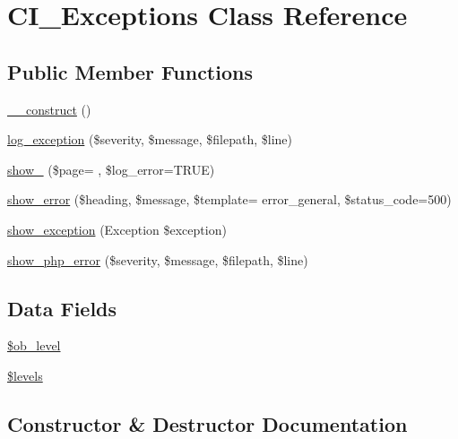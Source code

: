 \hypertarget{class_c_i___exceptions}{}\section{C\+I\+\_\+\+Exceptions Class Reference}
\label{class_c_i___exceptions}
\subsection*{Public Member Functions}
\begin{DoxyCompactItemize}
\item 
\hyperlink{class_c_i___exceptions_a095c5d389db211932136b53f25f39685}{\+\_\+\+\_\+construct} ()
\item 
\hyperlink{class_c_i___exceptions_a477bd3360509887aeb6e0a56bcdcad2a}{log\+\_\+exception} (\$severity, \$message, \$filepath, \$line)
\item 
\hyperlink{class_c_i___exceptions_a7ec82c1b0d3bbeb9338f236a1755a2a5}{show\+\_} (\$page= \textquotesingle{}\textquotesingle{}, \$log\+\_\+error=T\+R\+U\+E)
\item 
\hyperlink{class_c_i___exceptions_af68ad4102f7a42f9aaf68c40afe6d02c}{show\+\_\+error} (\$heading, \$message, \$template= \textquotesingle{}error\+\_\+general\textquotesingle{}, \$status\+\_\+code=500)
\item 
\hyperlink{class_c_i___exceptions_ac781a8be253cad387841809c44c85639}{show\+\_\+exception} (Exception \$exception)
\item 
\hyperlink{class_c_i___exceptions_a7962c30cacf1341dac1c44d8ab57cebe}{show\+\_\+php\+\_\+error} (\$severity, \$message, \$filepath, \$line)
\end{DoxyCompactItemize}
\subsection*{Data Fields}
\begin{DoxyCompactItemize}
\item 
\hyperlink{class_c_i___exceptions_abb6b6587dbaf0238bf26829c8df05d59}{\$ob\+\_\+level}
\item 
\hyperlink{class_c_i___exceptions_a1035dc0448354cc79f8f9e1ca8dfd0cb}{\$levels}
\end{DoxyCompactItemize}


\subsection{Constructor \& Destructor Documentation}
\hypertarget{class_c_i___exceptions_a095c5d389db211932136b53f25f39685}{}
